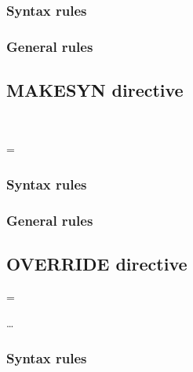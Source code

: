 \begin{syntax}[\miscextcolour]
  \begin{1=}
     \\
     \\
  \end{1=} \\
\end{syntax}

\subsubsection{Syntax rules}

\subsubsection{General rules}

\subsection{MAKESYN directive}

\begin{syntax}[\miscextcolour]
  \begin{1=}
     \\
  \end{1=}
  \literal = \literal
\end{syntax}

\subsubsection{Syntax rules}

\subsubsection{General rules}

\subsection{OVERRIDE directive}

\begin{syntax}[\miscextcolour]
  \begin{1=}
    \literal = \literal
  \end{1=} \dots
\end{syntax}

\subsubsection{Syntax rules}

